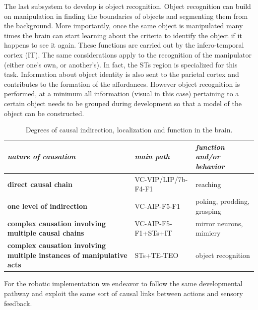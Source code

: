 The last subsystem to develop is object recognition. Object 
recognition can build on manipulation in finding the boundaries
of objects and segmenting them from the background. More importantly,
once the same object is manipulated many times the brain can
start learning about the criteria to identify the object if 
it happens to see it again. These functions are
carried out by the infero-temporal cortex (IT).
The same considerations apply to the recognition of the 
manipulator (either one's own, or another's). In fact, the STs region is specialized
for this task. Information about object identity is
also sent to the parietal cortex and contributes to 
the formation of the affordances. 
However object recognition is performed, at a minimum all information (visual in this case) pertaining to a certain object
needs to be grouped during development so that a model of the object can be constructed.

\begin{table}[htbp]
\begin{center}
\begin{tabular}{|p{3.5cm}|p{2.5cm}|p{4.5cm}|}
\hline
{\it nature of causation} & {\it main path} &  {\it function and/or behavior} \\ \hline\hline
{\bf direct causal chain} & VC-VIP/LIP/7b-F4-F1 & reaching\\ \hline
{\bf one level of indirection} & VC-AIP-F5-F1 & poking, prodding, grasping\\ \hline
{\bf complex causation involving multiple causal chains} & VC-AIP-F5-F1+STs+IT & mirror neurons, mimicry\\ \hline
{\bf complex causation involving multiple instances of manipulative acts} & STs+TE-TEO & object recognition\\ \hline
\end{tabular}
\caption{
%
Degrees of causal indirection, localization and function in the brain.
%
}
\label{tab:circuits}
\end{center}
\end{table}

For the robotic implementation we endeavor to follow the same developmental
pathway and exploit the same sort of causal links between actions and 
sensory feedback.

\fi